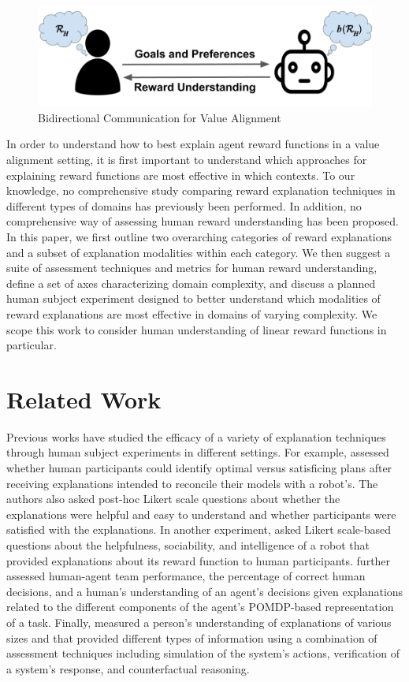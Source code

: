 \documentclass[letterpaper]{article} %
\begin{document}
    \begin{figure}[t]
      \centering
      \includegraphics[width=0.8\columnwidth]{twowaycomm1.png}
      \caption{Bidirectional Communication for Value Alignment}
      \label{twoway}
    \end{figure}


In order to understand how to best explain agent reward functions in a value alignment setting, it is first important to understand which approaches for explaining reward functions are most effective in which contexts. To our knowledge, no comprehensive study comparing reward explanation techniques in different types of domains has previously been performed. In addition, no comprehensive way of assessing human reward understanding has been proposed. In this paper, we first outline two overarching categories of reward explanations and a subset of explanation modalities within each category. We then suggest a suite of assessment techniques and metrics for human reward understanding, define a set of axes characterizing domain complexity, and discuss a planned human subject experiment designed to better understand which modalities of reward explanations are most effective in domains of varying complexity. We scope this work to consider human understanding of linear reward functions in particular.

\section{Related Work}
\label{related}
Previous works have studied the efficacy of a variety of explanation techniques through human subject experiments in different settings. For example, \citet{chakraborti2019plan} assessed whether human participants could identify optimal versus satisficing plans after receiving explanations intended to reconcile their models with a robot's. The authors also asked post-hoc Likert scale questions about whether the explanations were helpful and easy to understand and whether participants were satisfied with the explanations. In another experiment, \citet{tabrez2019explanation} asked Likert scale-based questions about the helpfulness, sociability, and intelligence of a robot that provided explanations about its reward function to human participants. \citet{wang2016impact} further assessed human-agent team performance, the percentage of correct human decisions, and a human's understanding of an agent's decisions given explanations related to the different components of the agent's POMDP-based representation of a task. Finally, \citet{lage2019evaluation} measured a person's understanding of explanations of various sizes and that provided different types of information using a combination of assessment techniques including simulation of the system's actions, verification of a system's response, and counterfactual reasoning.
\end{document}
